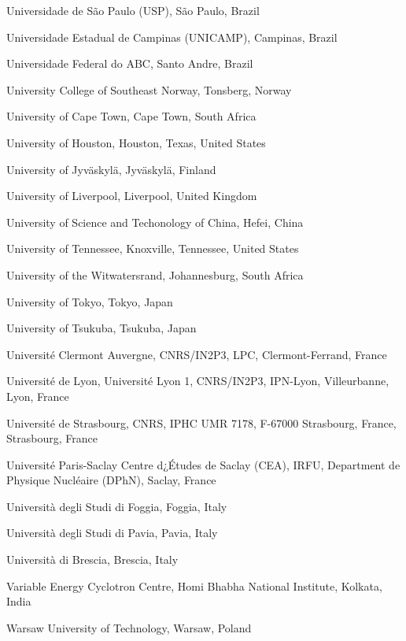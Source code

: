 \begin{flushleft}
\begin{Authlist}
\item {}Universidade de S\~{a}o Paulo (USP), S\~{a}o Paulo, Brazil
\item {}Universidade Estadual de Campinas (UNICAMP), Campinas, Brazil
\item {}Universidade Federal do ABC, Santo Andre, Brazil
\item {}University College of Southeast Norway, Tonsberg, Norway
\item {}University of Cape Town, Cape Town, South Africa
\item {}University of Houston, Houston, Texas, United States
\item {}University of Jyv\"{a}skyl\"{a}, Jyv\"{a}skyl\"{a}, Finland
\item {}University of Liverpool, Liverpool, United Kingdom
\item {}University of Science and Techonology of China, Hefei, China
\item {}University of Tennessee, Knoxville, Tennessee, United States
\item {}University of the Witwatersrand, Johannesburg, South Africa
\item {}University of Tokyo, Tokyo, Japan
\item {}University of Tsukuba, Tsukuba, Japan
\item {}Universit\'{e} Clermont Auvergne, CNRS/IN2P3, LPC, Clermont-Ferrand, France
\item {}Universit\'{e} de Lyon, Universit\'{e} Lyon 1, CNRS/IN2P3, IPN-Lyon, Villeurbanne, Lyon, France
\item {}Universit\'{e} de Strasbourg, CNRS, IPHC UMR 7178, F-67000 Strasbourg, France, Strasbourg, France
\item {} Universit\'{e} Paris-Saclay Centre d¿\'Etudes de Saclay (CEA), IRFU, Department de Physique Nucl\'{e}aire (DPhN), Saclay, France
\item {}Universit\`{a} degli Studi di Foggia, Foggia, Italy
\item {}Universit\`{a} degli Studi di Pavia, Pavia, Italy
\item {}Universit\`{a} di Brescia, Brescia, Italy
\item {}Variable Energy Cyclotron Centre, Homi Bhabha National Institute, Kolkata, India
\item {}Warsaw University of Technology, Warsaw, Poland

\end{Authlist}
\end{flushleft}
